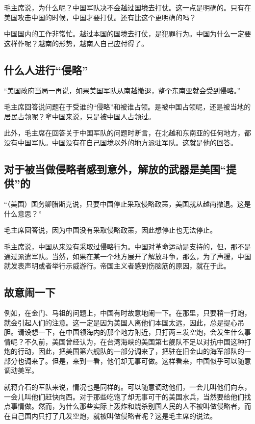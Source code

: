 毛主席说，为什么呢？中国军队决不会越过国境去打仗。这一点是明确的。只有在美国攻击中国的时候，中国才要打仗。还有比这个更明确的吗？

中国国内的工作非常忙。越过本国的国境去打仗，是犯罪行为。中国为什么一定要这样作呢？越南的形势，越南人自己应付得了。

\subsection{什么人进行“侵略”}

“美国政府当局一再说，如果美国军队从南越撤退，整个东南亚就会受到侵略。”

毛主席回答说问题在于受谁的“侵略”和被谁占领。是被中国占领呢，还是被当地的居民占领呢？拿中国来说，只是被中国人占领过。

此外，毛主席在回答关于中国军队的问题时断言，在北越和东南亚的任何地方，都没有中国军队。中国没有在自己国境以外的地方派驻军队。这就是他的回答。

\subsection{对于被当做侵略者感到意外，解放的武器是美国“提供”的}

“（美国）国务卿腊斯克说，只要中国停止采取侵略政策，美国就从越南撤退。这是什么意思？”

毛主席回答说，因为中国没有采取侵略政策，因此想停止也无法停止。

毛主席说，中国从来没有采取过侵略行为。中国对革命运动是支持的，但，那不是通过派遣军队。当然，如果在某一个地方展开了解放斗争，那么，为了声援，中国就发表声明或者举行示威游行。帝国主义者感到伤脑筋的原因，就在于此。

\subsection{故意闹一下}

例如，在金门、马祖的问题上，中国有时故意地闹一下。在那里，只要稍一打炮，就会引起人们的注意。这一定是因为美国人离他们本国太远，因此，总是提心吊胆。请设想一下，在中国领海内的那个地方附近，只打两三发空炮，会发生什么事情呢？不久前，美国曾经认为，在台湾海峡的美国第七舰队不足以对抗中国这种打炮的行动，因此，把美国第六舰队的一部分调来了，把驻在旧金山的海军部队的一部分也调来了。但是，来到一看，他们却无事可做。这样看来，中国似乎可以随意调动美军。

就蒋介石的军队来说，情况也是同样的。可以随意调动他们，一会儿叫他们向东，一会儿叫他们赶快向西。对于那些吃饱了却无事可干的美国水兵，当然要给他们找点事情做。然而，为什么那些实际上轰炸和烧杀别国人民的人不被叫做侵略者，而在自己国内只打了几发空炮，就被叫做侵略者呢？这是毛主席的说法。

